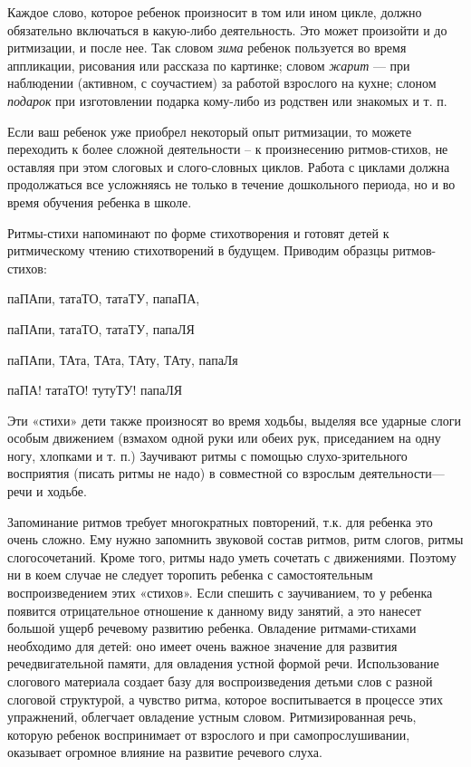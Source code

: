 \documentclass{book}
\renewcommand{\emph}[1]{\textit{#1}}
\begin{document}
Каждое слово, которое ребенок произносит в том или ином цикле, должно
обязательно включаться в какую-либо деятельность. Это может произойти и
до ритмизации, и после нее. Так словом \emph{зима} ребенок пользуется во
время аппликации, рисования или рассказа по картинке; словом
\emph{жарит} --- при наблюдении (активном, с соучастием) за работой
взрослого на кухне; слоном \emph{подарок} при изготовлении подарка
кому-либо из родствен или знакомых и т. п.

Если ваш ребенок уже приобрел некоторый опыт ритмизации, то можете
переходить к более сложной деятельности -- к произнесению ритмов-стихов,
не оставляя при этом слоговых и слого-словных циклов. Работа с циклами
должна продолжаться все усложняясь не только в течение дошкольного
периода, но и во время обучения ребенка в школе.

Ритмы-стихи напоминают по форме стихотворения и готовят детей к
ритмическому чтению стихотворений в будущем. Приводим образцы
ритмов-стихов:

паПАпи, татаТО, татаТУ, папаПА,

паПАпи, татаТО, татаТУ, папаЛЯ

паПАпи, ТАта, ТАта, ТАту, ТАту, папаЛя

паПА! татаТО! тутуТУ! папаЛЯ

Эти «стихи» дети также произносят во время ходьбы, выделяя все ударные
слоги особым движением (взмахом одной руки или обеих рук, приседанием на
одну ногу, хлопками и т. п.) Заучивают ритмы с помощью слухо-зрительного
восприятия (писать ритмы не надо) в совместной со взрослым
деятельности---речи и ходьбе.

Запоминание ритмов требует многократных повторений, т.к. для ребенка это
очень сложно. Ему нужно запомнить звуковой состав ритмов, ритм слогов,
ритмы слогосочетаний. Кроме того, ритмы надо уметь сочетать с
движениями. Поэтому ни в коем случае не следует торопить ребенка с
самостоятельным воспроизведением этих «стихов». Если спешить с
заучиванием, то у ребенка появится отрицательное отношение к данному
виду занятий, а это нанесет большой ущерб речевому развитию ребенка.
Овладение ритмами-стихами необходимо для детей: оно имеет очень важное
значение для развития речедвигательной памяти, для овладения устной
формой речи. Использование слогового материала создает базу для
воспроизведения детьми слов с разной слоговой структурой, а чувство
ритма, которое воспитывается в процессе этих упражнений, облегчает
овладение устным словом. Ритмизированная речь, которую ребенок
воспринимает от взрослого и при самопрослушивании, оказывает огромное
влияние на развитие речевого слуха.
\end{document}
